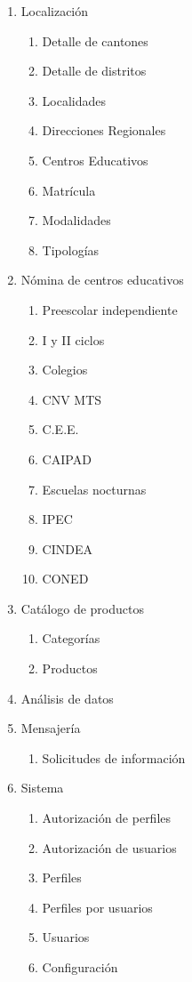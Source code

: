\documentclass[a4paper, 9pt, conference]{article}              %
\begin{document}
\begin{enumerate}
	\item Localizaci\'on
		\begin{enumerate}
			\item Detalle de cantones
			\item Detalle de distritos
			\item Localidades
			\item Direcciones Regionales
			\item Centros Educativos
			\item Matr\'icula
			\item Modalidades
			\item Tipolog\'ias
		\end{enumerate}
	\item N\'omina de centros educativos
		\begin{enumerate}
			\item Preescolar independiente
			\item I y II ciclos
			\item Colegios
			\item CNV MTS
			\item C.E.E.
			\item CAIPAD
			\item Escuelas nocturnas
			\item IPEC
			\item CINDEA
			\item CONED
		\end{enumerate}
	\item Cat\'alogo de productos
		\begin{enumerate}
			\item Categor\'ias
			\item Productos
		\end{enumerate}
	\item An\'alisis de datos
	\item Mensajer\'ia
		\begin{enumerate}
			\item Solicitudes de informaci\'on
		\end{enumerate}
	\item Sistema
		\begin{enumerate}
			\item Autorizaci\'on de perfiles
			\item Autorizaci\'on de usuarios
			\item Perfiles
			\item Perfiles por usuarios
			\item Usuarios
			\item Configuraci\'on
		\end{enumerate}
\end{enumerate}
\end{document}
